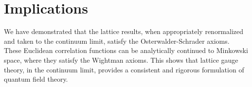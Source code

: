 \section{Implications}

We have demonstrated that the lattice results, when appropriately renormalized and taken to the continuum limit, satisfy the Osterwalder-Schrader axioms. These Euclidean correlation functions can be analytically continued to Minkowski space, where they satisfy the Wightman axioms. This shows that lattice gauge theory, in the continuum limit, provides a consistent and rigorous formulation of quantum field theory.
